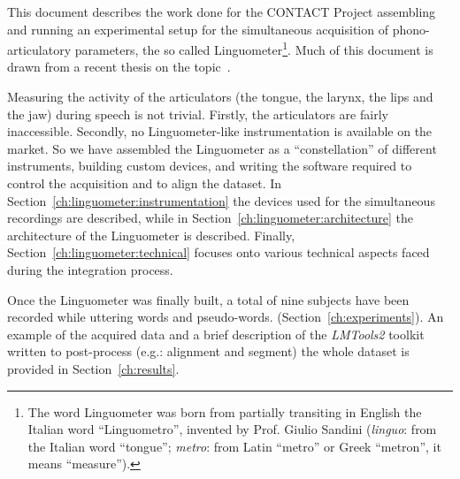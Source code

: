 This document
describes the work done for the 
CONTACT Project assembling and running an experimental setup for the 
simultaneous acquisition of phono-articulatory parameters, the so called 
Linguometer\footnote{The 
word Linguometer was born from partially transiting in English the Italian word
``Linguometro'', invented by Prof. Giulio Sandini
(\emph{linguo}: from the Italian word ``tongue''; \emph{metro}: from Latin 
``metro'' or Greek ``metron'', it means ``measure'').}.
Much of this document is drawn from a recent thesis on 
the topic~\cite{tavella2007simultaneous}.


Measuring the activity of the articulators (the tongue, the larynx, the lips and
the jaw) during speech is not trivial. 
Firstly, the articulators are fairly inaccessible.
Secondly, no Linguometer-like instrumentation is available on the market.
So we have assembled the Linguometer as a ``constellation'' of
different instruments, building custom devices, and 
writing the software required to control the acquisition and to align the
dataset.
In Section~\ref{ch:linguometer:instrumentation} the devices
used for the simultaneous recordings are described, while in 
Section~\ref{ch:linguometer:architecture} the architecture of
the Linguometer is described. Finally, Section~\ref{ch:linguometer:technical}
focuses onto various technical aspects faced during the integration
process.

Once the Linguometer was finally built, a total of nine
subjects have been recorded while uttering words and pseudo-words.
(Section~\ref{ch:experiments}).
An example of the acquired data and a brief description of the \emph{LMTools2}
toolkit written to post-process (e.g.: alignment and segment)
the whole dataset is provided in Section~\ref{ch:results}.

\pagebreak

